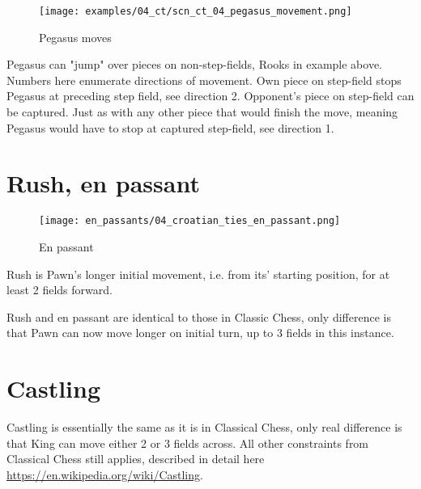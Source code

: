 \noindent
\begin{figure}[!h]
\vspace{-1.2\baselineskip}
\texttt{[image: examples/04\_ct/scn\_ct\_04\_pegasus\_movement.png]}
\caption{Pegasus moves}
\label{fig:scn_ct_04_pegasus_movement}
\end{figure}

Pegasus can "jump" over pieces on non-step-fields, Rooks in example above. Numbers
here enumerate directions of movement. Own piece on step-field stops Pegasus at
preceding step field, see direction 2. Opponent's piece on step-field can be captured.
Just as with any other piece that would finish the move, meaning Pegasus would have to
stop at captured step-field, see direction 1.

\clearpage %

\section*{Rush, en passant}

\noindent
\begin{wrapfigure}{l}{0.4\textwidth}
\centering
\texttt{[image: en\_passants/04\_croatian\_ties\_en\_passant.png]}
\caption{En passant}
\label{fig:04_croatian_ties_en_passant}
\end{wrapfigure}
Rush is Pawn’s longer initial movement, i.e. from its’ starting position, for at least
2 fields forward.

Rush and en passant are identical to those in Classic Chess, only difference is that Pawn
can now move longer on initial turn, up to 3 fields in this instance.

\clearpage %

\section*{Castling}

Castling is essentially the same as it is in Classical Chess, only real difference is that
King can move either 2 or 3 fields across. All other constraints from Classical Chess still
applies, described in detail here \\
\href{https://en.wikipedia.org/wiki/Castling}{https://en.wikipedia.org/wiki/Castling}.

